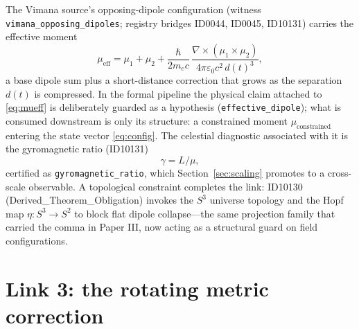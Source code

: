 \documentclass[11pt]{article}
\theoremstyle{remark}
\begin{document}
The Vimana source's opposing-dipole configuration (witness \texttt{vimana\_opposing\_dipoles}; registry bridges ID0044, ID0045, ID10131) carries the effective moment
\begin{equation}
\mu_{\mathrm{eff}} = \mu_1 + \mu_2 + \frac{\hbar}{2 m_e c}\, \frac{\nabla \times (\mu_1 \times \mu_2)}{4\pi \varepsilon_0 c^2\, d(t)^3},
\label{eq:mueff}
\end{equation}
a base dipole sum plus a short-distance correction that grows as the separation $d(t)$ is compressed. In the formal pipeline the physical claim attached to \eqref{eq:mueff} is deliberately guarded as a hypothesis (\texttt{effective\_dipole}); what is consumed downstream is only its structure: a constrained moment $\mu_{\mathrm{constrained}}$ entering the state vector \eqref{eq:config}. The celestial diagnostic associated with it is the gyromagnetic ratio (ID10131)
\begin{equation}
\gamma = L/\mu,
\end{equation}
certified as \texttt{gyromagnetic\_ratio}, which Section~\ref{sec:scaling} promotes to a cross-scale observable. A topological constraint completes the link: ID10130 (Derived\_Theorem\_Obligation) invokes the $S^3$ universe topology and the Hopf map $\eta: S^3 \to S^2$ to block flat dipole collapse---the same projection family that carried the comma in Paper III, now acting as a structural guard on field configurations.

\section{Link 3: the rotating metric correction}
\label{sec:metric}
\end{document}
